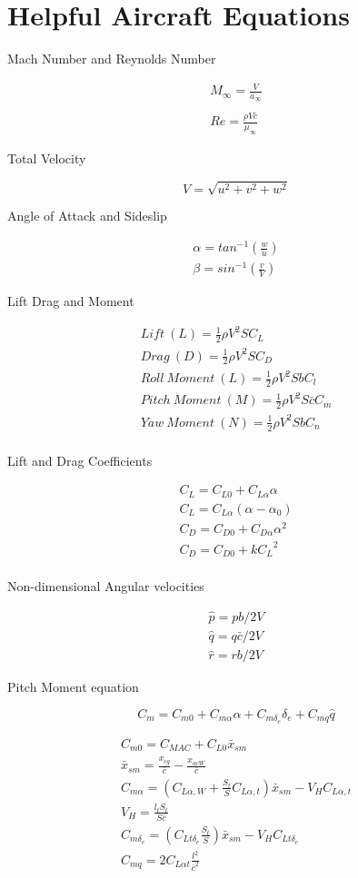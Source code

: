 \documentclass{article}
\def\beq{\begin{equation}}
\def\eeq{\end{equation}}
\def\beqn{\begin{matrix}}
\def\eeqn{\end{matrix}}
\begin{document}
\section{Helpful Aircraft Equations}

\begin{multicols}{2}

\noindent Mach Number and Reynolds Number

\beq
\beqn
M_{\infty} = \frac{V}{a_{\infty}} \\
\ \\
Re = \frac{\rho V \bar{c}}{\mu_{\infty}}
\eeqn
\eeq

\noindent Total Velocity

\beq
V = \sqrt{u^2 + v^2 + w^2}
\eeq

\noindent Angle of Attack and Sideslip

\beq
\beqn
\alpha = tan^{-1}\left(\frac{w}{u}\right)\\
\beta = sin^{-1}\left(\frac{v}{V}\right)
\eeqn
\eeq

\noindent Lift Drag and Moment

\beq
\beqn
Lift~(L) = \frac{1}{2} \rho V^2 S C_L \\
Drag~(D) = \frac{1}{2} \rho V^2 S C_D\\
Roll~Moment~(L) = \frac{1}{2} \rho V^2 S b C_l\\
Pitch~Moment~(M) = \frac{1}{2} \rho V^2 S \bar{c}C_m\\
Yaw~Moment~(N) = \frac{1}{2} \rho V^2 S b C_n\\
\eeqn
\eeq

\noindent Lift and Drag Coefficients

\beq
\beqn
C_L = C_{L0} + C_{L\alpha}\alpha\\
C_L = C_{L\alpha}(\alpha-\alpha_0)\\
C_D = C_{D0} + C_{D\alpha}\alpha^2 \\
C_D = C_{D0} + k{C_L}^2 \\
\eeqn
\eeq

\noindent Non-dimensional Angular velocities

\beq
\beqn
\hat{p} = pb/2V\\
\hat{q} = q\bar{c}/2V\\
\hat{r} = rb/2V
\eeqn
\eeq

\noindent Pitch Moment equation

\beq
C_m = C_{m0} + C_{m\alpha}\alpha + C_{m\delta_e}\delta_e +
C_{mq}\hat{q}
\eeq

\beq
\beqn
C_{m0} = C_{MAC} + C_{L0}\bar{x}_{sm} \\
\bar{x}_{sm} = \frac{x_{cg}}{\bar{c}} - \frac{x_{acW}}{\bar{c}} \\
C_{m\alpha} = \left(C_{L\alpha,W} +
\frac{S_t}{S}C_{L\alpha,t}\right)\bar{x}_{sm} - V_HC_{L\alpha,t}\\
V_H = \frac{l_tS_t}{S\bar{c}} \\
C_{m\delta_e} = \left(C_{Lt\delta_e}\frac{S_t}{S}\right)\bar{x}_{sm}-V_HC_{Lt\delta_e}\\
C_{mq} = 2C_{L\alpha t}\frac{l^2}{\bar{c}^2}
\eeqn
\eeq


\end{multicols}
\end{document}
